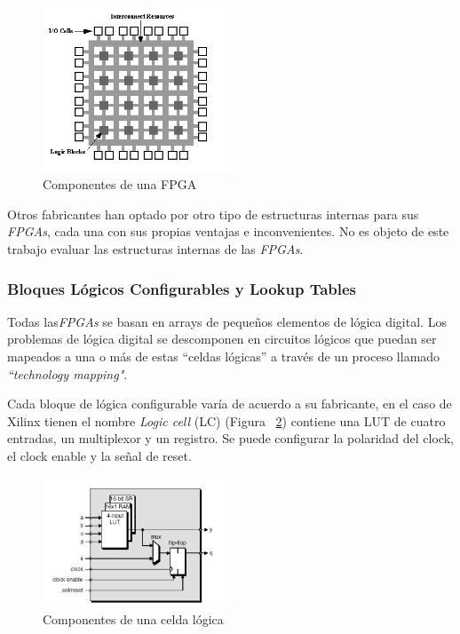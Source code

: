 	\begin{figure}[h!]
 	\begin{center}
   	\includegraphics[width=0.5\textwidth,keepaspectratio=true]{./images/fpga1a}
  	\caption{Componentes de una FPGA}
  	\label{fig:compfpga}
 	\end{center}
	\end{figure}

	\vspace{0.5cm}
	\par
	Otros fabricantes han optado por otro tipo de estructuras internas para sus \textit{FPGAs}, cada una con sus propias ventajas e inconvenientes. No es objeto
	de este trabajo evaluar las estructuras internas de las \textit{FPGAs}.
	
		\subsubsection{Bloques Lógicos Configurables y Lookup Tables}
		\par
		Todas las\textit{FPGAs} se basan en arrays de pequeños elementos de lógica digital. Los problemas de lógica digital se descomponen en circuitos
		lógicos que puedan ser mapeados a una o más de estas “celdas lógicas” a través de un proceso llamado \textit{“technology mapping"}.
		\vspace{0.5cm}
		\par
		Cada bloque de lógica configurable varía de acuerdo a su fabricante, en el caso de Xilinx tienen el nombre \textit{Logic cell} (LC) (Figura
		~\ref{fig:complc}) contiene una LUT de cuatro entradas, un multiplexor y un registro. Se puede configurar la polaridad del clock, el clock enable y
		la señal de reset.

		\begin{figure}[h!]
		\begin{center}
 		\includegraphics[width=0.5\textwidth,keepaspectratio=true]{./images/celda}
  		\caption{Componentes de una celda lógica}
  		\label{fig:complc}
 		\end{center}
		\end{figure}

